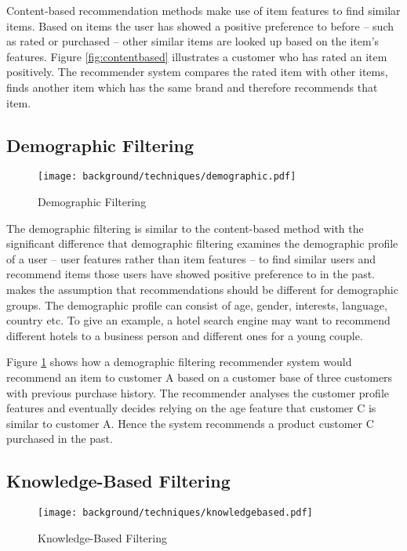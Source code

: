 Content-based recommendation methods make use of item features to find similar items. Based on items the user has showed a positive preference to before -- such as rated or purchased -- other similar items are looked up based on the item's features. Figure \ref{fig:contentbased} illustrates a customer who has rated an item positively. The recommender system compares the rated item with other items, finds another item which has the same brand and therefore recommends that item.

\subsection{Demographic Filtering}

\begin{figure}[ht]
    \texttt{[image: background/techniques/demographic.pdf]}
    \caption{Demographic Filtering}
    \label{fig:demographic}
\end{figure}

The demographic filtering is similar to the content-based method with the significant difference that demographic filtering examines the demographic profile of a user -- user features rather than item features -- to find similar users and recommend items those users have showed positive preference to in the past. \citet{burke07} makes the assumption that recommendations should be different for demographic groups. The demographic profile can consist of age, gender, interests, language, country etc. To give an example, a hotel search engine may want to recommend different hotels to a business person and different ones for a young couple.

Figure \ref{fig:demographic} shows how a demographic filtering recommender system would recommend an item to customer A based on a customer base of three customers with previous purchase history. The recommender analyses the customer profile features and eventually decides relying on the age feature that customer C is similar to customer A. Hence the system recommends a product customer C purchased in the past.

\subsection{Knowledge-Based Filtering}

\begin{figure}[ht]
    \texttt{[image: background/techniques/knowledgebased.pdf]}
    \caption{Knowledge-Based Filtering}
    \label{fig:knowledgebased}
\end{figure}

